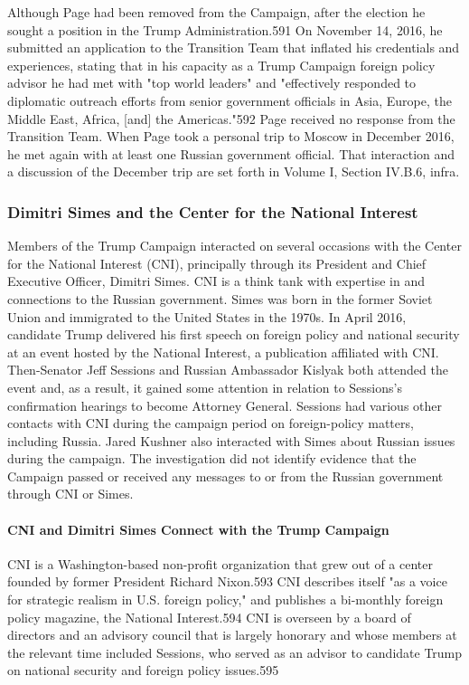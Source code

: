 Although Page had been removed from the Campaign, after the election he sought a position in the Trump Administration.591 On November 14, 2016, he submitted an application to the Transition Team that inflated his credentials and experiences, stating that in his capacity as a Trump Campaign foreign policy advisor he had met with "top world leaders"  and "effectively responded to diplomatic outreach efforts from senior government officials in Asia, Europe, the Middle East, Africa, [and] the Americas."592 Page received no response from the Transition Team. When Page took a  personal trip to Moscow in December 2016, he met again with at least one Russian government official. That interaction and a discussion of the December trip are set forth in Volume I, Section IV.B.6, infra.

\subsubsection{Dimitri Simes and the Center for the National Interest}

Members of the Trump Campaign interacted on several occasions with the Center for the National Interest (CNI), principally through its President and Chief Executive Officer, Dimitri Simes. CNI is a think tank with expertise in and connections to the Russian government. Simes was born in the former Soviet Union and immigrated to the United States in the 1970s. In April 2016, candidate Trump delivered his first speech on foreign policy and national security at an event hosted by the National Interest, a publication affiliated with CNI. Then-Senator Jeff Sessions and Russian Ambassador Kislyak both attended the event and, as a  result, it  gained some attention in relation to Sessions's confirmation hearings to become Attorney General. Sessions had various other contacts with CNI during the campaign period on foreign-policy matters, including Russia. Jared Kushner also interacted with Simes about Russian issues during the campaign. The investigation did not identify evidence that the Campaign passed or received any messages to or from the Russian government through CNI or Simes.

\paragraph{CNI and Dimitri Simes Connect with the Trump Campaign}

CNI is a  Washington-based non-profit organization that grew out of a  center founded by former President Richard Nixon.593 CNI describes itself "as a  voice for strategic realism in U.S. foreign policy," and publishes a bi-monthly foreign policy magazine, the National Interest.594 CNI is overseen by a  board of directors and an advisory council that is largely honorary and whose members at the relevant time included Sessions, who served as an advisor to candidate Trump on national security and foreign policy issues.595

